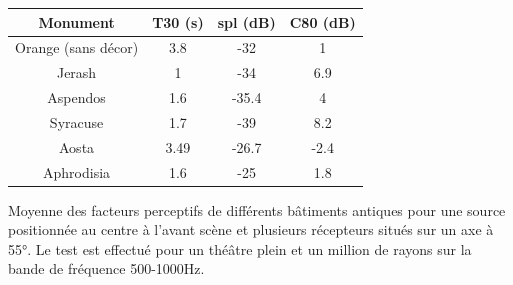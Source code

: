  \begin{tableth}
 \begin{tabular}{| *{4}{c|}} 
 \hline 
 Monument & \gls{T30} (s) & \gls{spl} (dB) & \gls{C80} (dB)  \\ 
 \hline 
 \hline 
Orange (sans décor) & 3.8  & -32   &  1      \\ 
  \hline
Jerash & 1  & -34 & 6.9  \\ 
  \hline 
Aspendos & 1.6 & -35.4  & 4  \\ 
 \hline 
Syracuse & 1.7  & -39  & 8.2  \\ 
 \hline 
Aosta & 3.49  & -26.7  & -2.4     \\
 \hline 
Aphrodisia & 1.6  & -25  & 1.8     \\ 
 \hline 
\end{tabular} 
 \caption{Moyenne des facteurs perceptifs de différents bâtiments antiques pour une source positionnée au centre à l'avant scène et plusieurs récepteurs situés sur un axe à 55°. Le test est effectué pour un théâtre plein et un million de rayons sur la bande de fréquence 500-1000Hz.}
 \label{tab_rindel2} 
 \end{tableth}


\newpage

